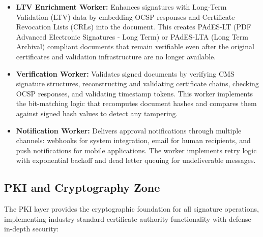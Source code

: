 \documentclass[12pt,oneside,openright,a4paper]{cpe-english-project}
\begin{document}
\begin{itemize}
\item \textbf{LTV Enrichment Worker:} Enhances signatures with Long-Term Validation (LTV) data by embedding OCSP responses and Certificate Revocation Lists (CRLs) into the document. This creates PAdES-LT (PDF Advanced Electronic Signatures - Long Term) or PAdES-LTA (Long Term Archival) compliant documents that remain verifiable even after the original certificates and validation infrastructure are no longer available.

\item \textbf{Verification Worker:} Validates signed documents by verifying CMS signature structures, reconstructing and validating certificate chains, checking OCSP responses, and validating timestamp tokens. This worker implements the bit-matching logic that recomputes document hashes and compares them against signed hash values to detect any tampering.

\item \textbf{Notification Worker:} Delivers approval notifications through multiple channels: webhooks for system integration, email for human recipients, and push notifications for mobile applications. The worker implements retry logic with exponential backoff and dead letter queuing for undeliverable messages.
\end{itemize}

\vspace{1em}

\subsection{PKI and Cryptography Zone}

The PKI layer provides the cryptographic foundation for all signature operations, implementing industry-standard certificate authority functionality with defense-in-depth security:
\end{document}
